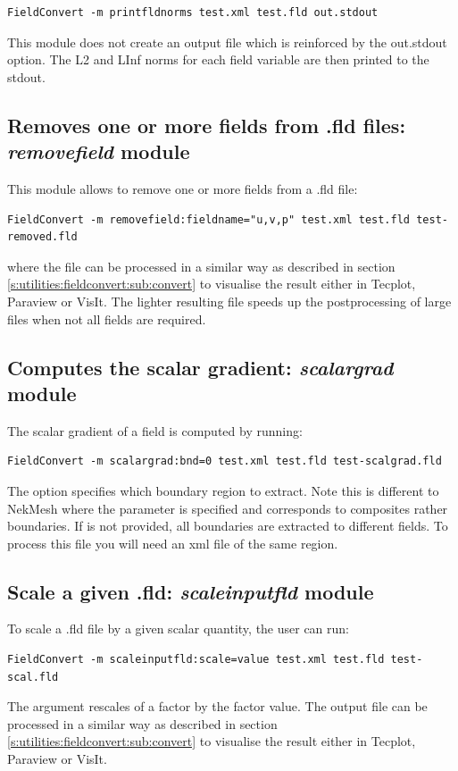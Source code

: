 \begin{lstlisting}[style=BashInputStyle]
FieldConvert -m printfldnorms test.xml test.fld out.stdout
\end{lstlisting}

This module does not create an output file which is reinforced by the
out.stdout option. The L2 and LInf norms for each field variable are
then printed to the stdout.
%
%
%

\subsection{Removes one or more fields from .fld files: \textit{removefield} module}
This module allows to remove one or more fields from a .fld file:
\begin{lstlisting}[style=BashInputStyle]
FieldConvert -m removefield:fieldname="u,v,p" test.xml test.fld test-removed.fld
\end{lstlisting}
where the file  can be processed in a similar
way as described in section \ref{s:utilities:fieldconvert:sub:convert}
to visualise the result either in Tecplot, Paraview or VisIt. The lighter resulting
file speeds up the postprocessing of large files when not all fields are required.
%
%
%

\subsection{Computes the scalar gradient: \textit{scalargrad} module}
The scalar gradient of a field is computed by running:
\begin{lstlisting}[style=BashInputStyle]
FieldConvert -m scalargrad:bnd=0 test.xml test.fld test-scalgrad.fld
\end{lstlisting}
The option  specifies which boundary region to extract. Note this is different to NekMesh where the parameter  is specified and corresponds to composites rather boundaries. If  is not provided, all boundaries are extracted to different fields. To process this file you will need an xml file of the same region.

%
%
%

\subsection{Scale a given .fld: \textit{scaleinputfld} module}
To scale a .fld file by a given scalar quantity, the user can run:
\begin{lstlisting}[style=BashInputStyle]
FieldConvert -m scaleinputfld:scale=value test.xml test.fld test-scal.fld
\end{lstlisting}
The argument  rescales of a factor 
 by the factor value.
The output file  can be processed in a similar
way as described in section \ref{s:utilities:fieldconvert:sub:convert}
to visualise the result  either in Tecplot, Paraview or VisIt.

